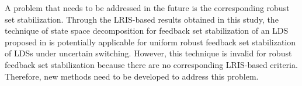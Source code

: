 \documentclass[11pt,onecolumn]{article}
\begin{document}
 A problem that needs to be addressed in the future is the corresponding robust set stabilization. Through the LRIS-based results obtained in this study, the technique of state space decomposition for feedback set stabilization of an LDS proposed in \cite{Guo2015Set} is potentially applicable for uniform robust feedback set stabilization of LDSs under uncertain switching. However, this technique is invalid for robust feedback set stabilization because there are no corresponding LRIS-based criteria. Therefore, new methods need to be developed to address this problem.
	
	
	
	
	

%
%
%	



	
	
	
\end{document}
